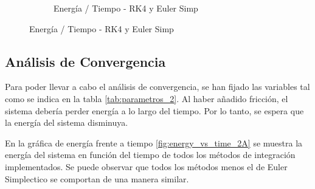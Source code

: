 \documentclass{article}
\begin{document}
\begin{figure}[H]
\begin{subfigure}{0.48\textwidth}
        \caption{Energía / Tiempo - RK4 y Euler Simp}
        \label{fig:energy_vs_time_1_B}
    \end{subfigure}

    \label{fig:combined_energy_vs_time_1}
\end{figure}





\subsection{Análisis de Convergencia}

Para poder llevar a cabo el análisis de convergencia, se han fijado las variables tal como se indica en la tabla \ref{tab:parametros_2}. Al haber añadido fricción, el sistema debería perder energía a lo largo del tiempo. Por lo tanto, se espera que la energía del sistema disminuya.

En la gráfica de energía frente a tiempo \ref{fig:energy_vs_time_2A} se muestra la energía del sistema en función del tiempo de todos los métodos de integración implementados. Se puede observar que todos los métodos menos el de Euler Simplectico se comportan de una manera similar.
\end{document}
